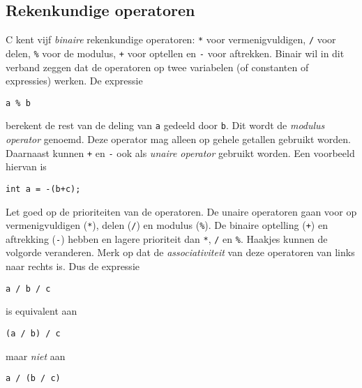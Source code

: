 \subsection{Rekenkundige operatoren}
C kent vijf \textsl{binaire} rekenkundige operatoren: \texttt{*} voor vermenigvuldigen, \texttt{/} voor delen, \texttt{\%} voor de modulus, \texttt{+} voor optellen en \texttt{-} voor aftrekken. Binair wil in dit verband zeggen dat de operatoren op twee variabelen (of constanten of expressies) werken. 
De expressie

\hspace*{1em}\texttt{a \% b}

berekent de rest van de deling van \texttt{a} gedeeld door \texttt{b}. Dit wordt de \textsl{modulus operator} genoemd. Deze operator mag alleen op gehele getallen gebruikt worden. Daarnaast kunnen \texttt{+} en \texttt{-} ook als \textsl{unaire operator} gebruikt worden. Een voorbeeld hiervan is

\hspace*{1em}\texttt{int a = -(b+c);}

Let goed op de prioriteiten van de operatoren. De unaire operatoren gaan voor op vermenigvuldigen (\texttt{*}), delen (\texttt{/}) en modulus (\texttt{\%}). De binaire optelling (\texttt{+}) en aftrekking (\texttt{-}) hebben en lagere prioriteit dan \texttt{*}, \texttt{/} en \texttt{\%}. Haakjes kunnen de volgorde veranderen. Merk op dat de \textsl{associativiteit} van deze operatoren van links naar rechts is. Dus de expressie

\hspace*{1em}\texttt{a / b / c}

is equivalent aan

\hspace*{1em}\texttt{(a / b) / c}
 
maar \textsl{niet} aan

\hspace*{1em}\texttt{a / (b / c)}

